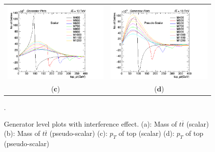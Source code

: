 \documentclass{cmspaper}
\begin{document}
\begin{figure}[htp]
\begin{tabular}{cc}
\includegraphics[scale=0.42]{genPlots/top_pt_scalar.png}
& \hspace{-1.2cm} \includegraphics[scale=0.42]{genPlots/top_pt_pscalar.png}\\
   ($\mathbf{c}$)\qquad\qquad&($\mathbf{d}$)\qquad\qquad\qquad\\
\end{tabular}
\caption{Generator level plots with interference effect. (a): Mass of $t\overline{t}$ (scalar) (b): Mass of $t\overline{t}$ (pseudo-scalar) (c): $p_{T}$ of top (scalar) (d): $p_{T}$ of top (pseudo-scalar)}.\label{genPlots}
\end{figure}

\end{document}
